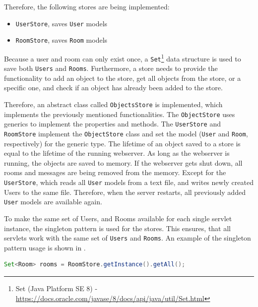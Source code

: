 Therefore, the following stores are being implemented:
\begin{itemize}
\item \texttt{UserStore}, saves \texttt{User} models
\item \texttt{RoomStore}, saves \texttt{Room} models
\end{itemize}
Because a user and room can only exist once, a \texttt{Set}\footnote{Set (Java Platform SE 8) - \url{https://docs.oracle.com/javase/8/docs/api/java/util/Set.html}} data structure is used to save both \texttt{Users} and \texttt{Rooms}. Furthermore, a store needs to provide the functionality to add an object to the store, get all objects from the store, or a specific one, and check if an object has already been added to the store.


Therefore, an abstract class called \texttt{ObjectsStore} is implemented, which implements the previously mentioned functionalities.
The \texttt{ObjectStore} uses generics to implement the properties and methods. The \texttt{UserStore} and \texttt{RoomStore} implement the \texttt{ObjectStore} class and set the model (\texttt{User} and \texttt{Room}, respectively) for the generic type.
The lifetime of an object saved to a store is equal to the lifetime of the running webserver. As long as the webserver is running, the objects are saved to memory. If the webserver gets shut down, all rooms and messages are being removed from the memory.
Except for the \texttt{UserStore}, which reads all \texttt{User} models from a text file, and writes newly created Users to the same file. Therefore, when the server restarts, all previously added \texttt{User} models are available again.

To make the same set of Users, and Rooms available for each single servlet instance, the singleton pattern is used for the stores. This ensures, that all servlets work with the same set of \texttt{Users} and \texttt{Rooms}. An example of the singleton pattern usage is shown in .
\begin{lstlisting}[label=lst:03_impl_objstores_singleton, caption=Example usage of the singleton pattern, language=java]
Set<Room> rooms = RoomStore.getInstance().getAll();
\end{lstlisting}


